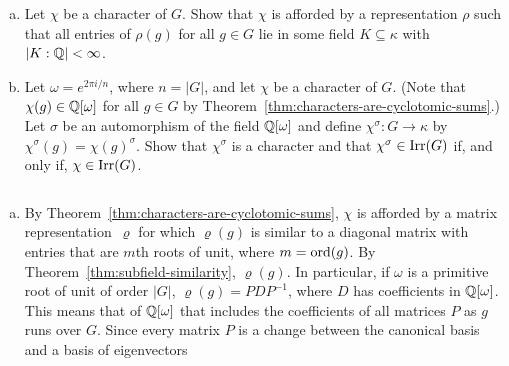 \begin{probl}${}$
    \begin{enumerate}[a),font=\upshape]
        \item Let\/ $\chi$ be a character of\/ $G$. Show that\/ $\chi$ is afforded by a representation\/ $\rho$ such that all entries of\/ $\rho(g)$ for all\/ $g \in G$ lie in some field\/ $K \subseteq \kappa$ with\/ $|K:\mathbb{Q}| < \infty$.
        
        \item Let\/ $\omega = e^{2\pi i/n}$, where\/ $n = |G|$, and let\/ $\chi$ be a character of\/ $G$. (Note that\/ $\chi(g) \in \mathbb{Q}[\omega]$ for all\/ $g \in G$ by\/ {\rm Theorem~\ref{thm:characters-are-cyclotomic-sums}.}) Let\/ $\sigma$ be an automorphism of\/ the field\/ $\mathbb{Q}[\omega]$ and define\/ $\chi^{\sigma}\colon G\to\kappa$ by\/ $\chi^{\sigma}(g) = \chi(g)^{\sigma}$. Show that\/ $\chi^{\sigma}$ is a character and that\/ $\chi^{\sigma} \in \operatorname{Irr}(G)$ if, and only if, $\chi \in \operatorname{Irr}(G)$.
    \end{enumerate}
\end{probl}

\begin{solution}${}$
    \begin{enumerate}[a)]
        \item By Theorem~\ref{thm:characters-are-cyclotomic-sums}, $\chi$ is afforded by a matrix representation~$\varrho$ for which $\varrho(g)$ is similar to a diagonal matrix with entries that are $m$th roots of unit, where $m=\operatorname{ord}(g)$. By Theorem~\ref{thm:subfield-similarity}, $\varrho(g)$.  In particular, if $\omega$ is a primitive root of unit of order $|G|$, $\varrho(g)=PDP^{-1}$, where $D$ has coefficients in $\mathbb{Q}[\omega]$. This means that  of $\mathbb{Q}[\omega]$ that includes the coefficients of all matrices $P$ as $g$ runs over $G$. Since every matrix $P$ is a change between the canonical basis and a basis of eigenvectors
    \end{enumerate}
\end{solution}